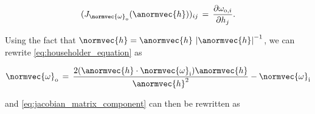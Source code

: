 \begin{equation} \label{eq:jacobian_matrix_component}
(J_{\normvec{\omega}_{\text{o}}}(\anormvec{h}))_{ij} \,=\, \frac{\partial\omega_{\text{o},i}}{\partial h_{j}}.
\end{equation}

Using the fact that $\normvec{h} = \anormvec{h}\,\left|\anormvec{h}\right|^{-1}$, we can rewrite \eqref{eq:householder_equation} as

\begin{equation} 
\normvec{\omega}_{\text{o}} \,=\, \frac{2(\anormvec{h}\cdot\normvec{\omega}_{\text{i}})\anormvec{h}}{\anormvec{h}^2} - \normvec{\omega}_{\text{i}}
\end{equation}

and \eqref{eq:jacobian_matrix_component} can then be rewritten as

